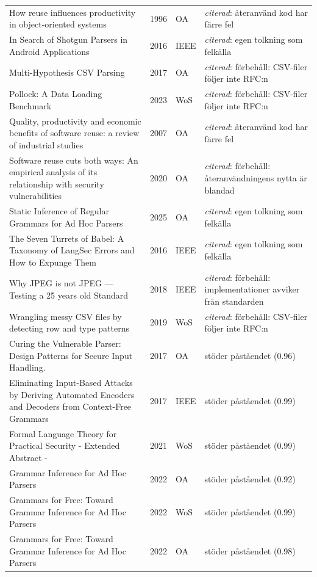 \begin{longtable}{@{}%
  >{\raggedright\arraybackslash}p{}c%
  >{\raggedright\arraybackslash}p{}%
  >{\raggedright\arraybackslash}p{}@{}}
How reuse influences productivity in object-oriented systems & 1996 & OA & \emph{citerad}: återanvänd kod har färre fel \\
In Search of Shotgun Parsers in Android Applications & 2016 & IEEE & \emph{citerad}: egen tolkning som felkälla \\
Multi-Hypothesis CSV Parsing & 2017 & OA & \emph{citerad}: förbehåll: CSV-filer följer inte RFC:n \\
Pollock: A Data Loading Benchmark & 2023 & WoS & \emph{citerad}: förbehåll: CSV-filer följer inte RFC:n \\
Quality, productivity and economic benefits of software reuse: a review of industrial studies & 2007 & OA & \emph{citerad}: återanvänd kod har färre fel \\
Software reuse cuts both ways: An empirical analysis of its relationship with security vulnerabilities & 2020 & OA & \emph{citerad}: förbehåll: återanvändningens nytta är blandad \\
Static Inference of Regular Grammars for Ad Hoc Parsers & 2025 & OA & \emph{citerad}: egen tolkning som felkälla \\
The Seven Turrets of Babel: A Taxonomy of LangSec Errors and How to Expunge Them & 2016 & IEEE & \emph{citerad}: egen tolkning som felkälla \\
Why JPEG is not JPEG --- Testing a 25 years old Standard & 2018 & IEEE & \emph{citerad}: förbehåll: implementationer avviker från standarden \\
Wrangling messy CSV files by detecting row and type patterns & 2019 & WoS & \emph{citerad}: förbehåll: CSV-filer följer inte RFC:n \\
Curing the Vulnerable Parser: Design Patterns for Secure Input Handling. & 2017 & OA & stöder påståendet (0.96) \\
Eliminating Input-Based Attacks by Deriving Automated Encoders and Decoders from Context-Free Grammars & 2017 & IEEE & stöder påståendet (0.99) \\
Formal Language Theory for Practical Security - Extended Abstract - & 2021 & WoS & stöder påståendet (0.99) \\
Grammar Inference for Ad Hoc Parsers & 2022 & OA & stöder påståendet (0.92) \\
Grammars for Free: Toward Grammar Inference for Ad Hoc Parsers & 2022 & WoS & stöder påståendet (0.99) \\
Grammars for Free: Toward Grammar Inference for Ad Hoc Parsers & 2022 & OA & stöder påståendet (0.98) \\

\end{longtable}
